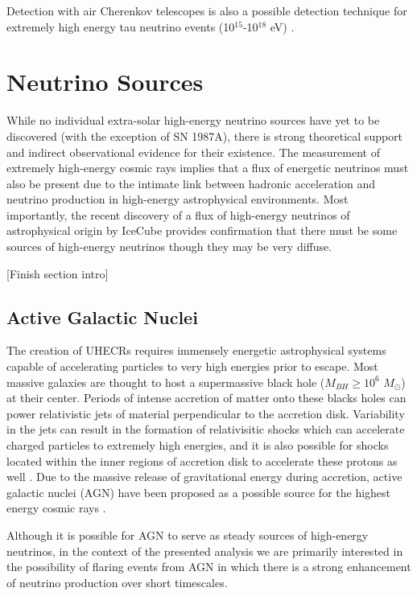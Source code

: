 \documentclass{gatech-thesis}
\begin{document}
Detection with air Cherenkov telescopes is also a possible detection technique for extremely high energy tau neutrino events (10$^{15}$-10$^{18}$ eV) \cite{2013APh....41....7A}.
\chapter{Neutrino Sources}
While no individual extra-solar high-energy neutrino sources have yet to be discovered (with the exception of SN 1987A), there is strong theoretical support  and indirect observational evidence for their existence. The measurement of extremely high-energy cosmic rays implies that a flux of energetic neutrinos must also be present due to the intimate link between hadronic acceleration and neutrino production in high-energy astrophysical environments. Most importantly, the recent discovery of a flux of high-energy neutrinos of astrophysical origin by IceCube \cite{2013Sci...342E...1I} provides confirmation that there must be some sources of high-energy neutrinos though they may be very diffuse.


[Finish section intro]

\section{Active Galactic Nuclei}
The creation of UHECRs requires immensely energetic astrophysical systems capable of accelerating particles to very high energies prior to escape. Most massive galaxies are thought to host a supermassive black hole ($M_{BH} \geq 10^{6}$ $M_{\odot}$) at their center. Periods of intense accretion of matter onto these blacks holes can power relativistic jets of material perpendicular to the accretion disk. Variability in the jets can result in the formation of relativisitic shocks which can accelerate charged particles to extremely high energies, and it is also possible for shocks located within the inner regions of accretion disk to accelerate these protons as well \cite{1996SSRv...75..341S}. Due to the massive release of gravitational energy during accretion, active galactic nuclei (AGN) have been proposed as a possible source for the highest energy cosmic rays \cite{1996SSRv...75..341S}.

Although it is possible for AGN to serve as steady sources of high-energy neutrinos, in the context of the presented analysis we are primarily interested in the possibility of flaring events from AGN in which there is a strong enhancement of neutrino production over short timescales.
\end{document}

